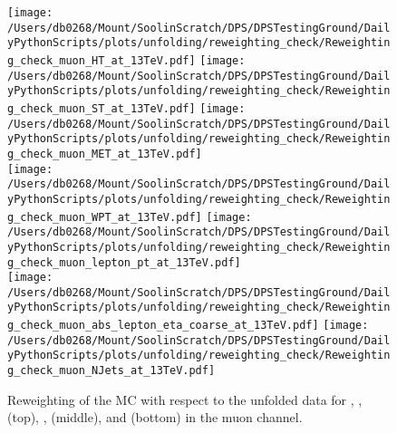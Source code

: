 \begin{figure*}[htpb]
	\centering
	\texttt{[image: /Users/db0268/Mount/SoolinScratch/DPS/DPSTestingGround/DailyPythonScripts/plots/unfolding/reweighting\_check/Reweighting\_check\_muon\_HT\_at\_13TeV.pdf]} 
	\texttt{[image: /Users/db0268/Mount/SoolinScratch/DPS/DPSTestingGround/DailyPythonScripts/plots/unfolding/reweighting\_check/Reweighting\_check\_muon\_ST\_at\_13TeV.pdf]} 
	\texttt{[image: /Users/db0268/Mount/SoolinScratch/DPS/DPSTestingGround/DailyPythonScripts/plots/unfolding/reweighting\_check/Reweighting\_check\_muon\_MET\_at\_13TeV.pdf]} \\
	\texttt{[image: /Users/db0268/Mount/SoolinScratch/DPS/DPSTestingGround/DailyPythonScripts/plots/unfolding/reweighting\_check/Reweighting\_check\_muon\_WPT\_at\_13TeV.pdf]} 
	\texttt{[image: /Users/db0268/Mount/SoolinScratch/DPS/DPSTestingGround/DailyPythonScripts/plots/unfolding/reweighting\_check/Reweighting\_check\_muon\_lepton\_pt\_at\_13TeV.pdf]} \\
	\texttt{[image: /Users/db0268/Mount/SoolinScratch/DPS/DPSTestingGround/DailyPythonScripts/plots/unfolding/reweighting\_check/Reweighting\_check\_muon\_abs\_lepton\_eta\_coarse\_at\_13TeV.pdf]}
	\texttt{[image: /Users/db0268/Mount/SoolinScratch/DPS/DPSTestingGround/DailyPythonScripts/plots/unfolding/reweighting\_check/Reweighting\_check\_muon\_NJets\_at\_13TeV.pdf]}
	\caption[Reweighting of the \PowhegPythia{} MC with respect to the unfolded data for \HT{}, \ST{}, \MET{} (top), \WPT{}, \LPT{} (middle), \LETA{} and \NJET{} (bottom) in the muon channel.]{Reweighting of the \PowhegPythia{} MC with respect to the unfolded data for \HT{}, \ST{}, \MET{} (top), \WPT{}, \LPT{} (middle), \LETA{} and \NJET{} (bottom) in the muon channel.}
	\label{fig:Reweightingsmu}
\end{figure*}